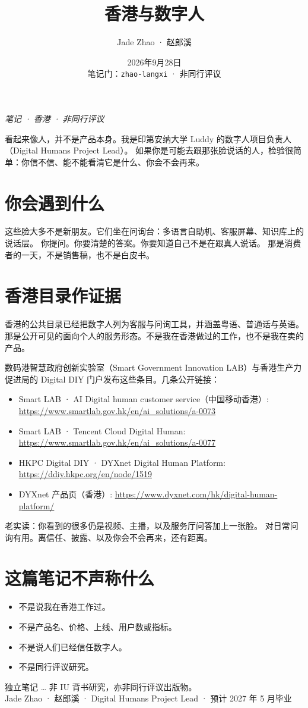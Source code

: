 \documentclass[11pt,a4paper]{ctexart}
\title{香港与数字人}
\author{Jade Zhao · 赵郎溪}
\date{2026年9月28日 \\ \small 笔记门：\texttt{zhao-langxi} · 非同行评议}
\begin{document}
\maketitle

\noindent\textit{笔记 · 香港 · 非同行评议}

看起来像人，并不是产品本身。我是印第安纳大学 Luddy 的数字人项目负责人（Digital Humans Project Lead）。
如果你是可能去跟那张脸说话的人，检验很简单：你信不信、能不能看清它是什么、你会不会再来。

\section*{你会遇到什么}

这些脸大多不是新朋友。它们坐在问询台：多语言自助机、客服屏幕、知识库上的说话层。
你提问。你要清楚的答案。你要知道自己不是在跟真人说话。
那是消费者的一天，不是销售稿，也不是白皮书。

\section*{香港目录作证据}

香港的公共目录已经把数字人列为客服与问询工具，并涵盖粤语、普通话与英语。
那是公开可见的面向个人的服务形态。不是我在香港做过的工作，也不是我在卖的产品。

数码港智慧政府创新实验室（Smart Government Innovation LAB）与香港生产力促进局的 Digital DIY 门户发布这些条目。几条公开链接：

\begin{itemize}
  \item Smart LAB · AI Digital human customer service（中国移动香港）:
    \url{https://www.smartlab.gov.hk/en/ai_solutions/a-0073}
  \item Smart LAB · Tencent Cloud Digital Human:
    \url{https://www.smartlab.gov.hk/en/ai_solutions/a-0077}
  \item HKPC Digital DIY · DYXnet Digital Human Platform:
    \url{https://ddiy.hkpc.org/en/node/1519}
  \item DYXnet 产品页（香港）:
    \url{https://www.dyxnet.com/hk/digital-human-platform/}
\end{itemize}

老实读：你看到的很多仍是视频、主播，以及服务厅问答加上一张脸。
对日常问询有用。离信任、披露、以及你会不会再来，还有距离。

\section*{这篇笔记不声称什么}

\begin{itemize}
  \item 不是说我在香港工作过。
  \item 不是产品名、价格、上线、用户数或指标。
  \item 不是说人们已经信任数字人。
  \item 不是同行评议研究。
\end{itemize}

\vspace{1.2em}
\noindent\small 独立笔记 \ldots{} 非 IU 背书研究，亦非同行评议出版物。\\
Jade Zhao · 赵郎溪 · Digital Humans Project Lead · 预计 2027 年 5 月毕业
\end{document}
